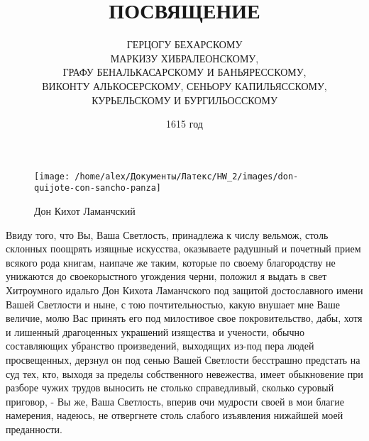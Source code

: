 \documentclass[12pt, a4paper]{article}
\author{ГЕРЦОГУ БЕХАРСКОМУ\\
	 МАРКИЗУ ХИБРАЛЕОНСКОМУ, \\
	 ГРАФУ БЕНАЛЬКАСАРСКОМУ И БАНЬЯРЕССКОМУ,\\ 
	 ВИКОНТУ АЛЬКОСЕРСКОМУ, СЕНЬОРУ КАПИЛЬЯССКОМУ, \\
	 КУРЬЕЛЬСКОМУ И БУРГИЛЬОССКОМУ}
\title{ПОСВЯЩЕНИЕ}
\date{1615 год}
\begin{document}
	\maketitle 
	
	\begin{wrapfigure}{L}{0.5\linewidth}
		\texttt{[image: /home/alex/Документы/Латекс/HW\_2/images/don-quijote-con-sancho-panza]}
		\caption{Дон Кихот Ламанчский}
	\end{wrapfigure}
Ввиду того, что Вы, Ваша Светлость, принадлежа к числу  вельмож,  столь
склонных поощрять изящные искусства, оказываете радушный  и  почетный  прием
всякого рода книгам, наипаче же таким, которые  по  своему  благородству  не
унижаются до  своекорыстного  угождения  черни,  положил  я  выдать  в  свет
Хитроумного идальго Дон Кихота Ламанчского под защитой  достославного  имени
Вашей Светлости и ныне,  с  тою  почтительностью,  какую  внушает  мне  Ваше
величие, молю Вас принять его под  милостивое  свое  покровительство,  дабы,
хотя  и  лишенный  драгоценных  украшений  изящества  и   учености,   обычно
составляющих   убранство   произведений,   выходящих   из-под   пера   людей
просвещенных, дерзнул он под сенью Вашей Светлости бесстрашно  предстать  на
суд тех, кто, выходя за пределы собственного невежества,  имеет  обыкновение
при разборе чужих трудов выносить не столько справедливый,  сколько  суровый
приговор, - Вы же, Ваша Светлость, вперив очи мудрости своей  в  мои  благие
намерения, надеюсь, не отвергнете столь  слабого  изъявления  нижайшей  моей
преданности.
	
\end{document}
